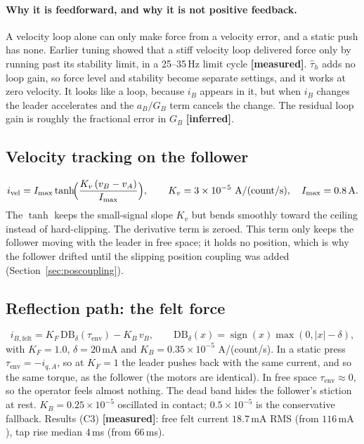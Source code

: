 \documentclass[11pt,a4paper]{article}
\newcommand{\mA}{\,\mathrm{mA}}
\newcommand{\A}{\,\mathrm{A}}
\newcommand{\measured}{\textcolor{teal!70!black}{\textbf{[measured]}}}
\newcommand{\inferred}{\textcolor{orange!80!black}{\textbf{[inferred]}}}
\begin{document}
\paragraph{Why it is feedforward, and why it is not positive feedback.}
A velocity loop alone can only make force from a velocity error, and a
static push has none. Earlier tuning showed that a stiff velocity loop
delivered force only by running past its stability limit, in a
25--35\,Hz limit cycle \measured. $\hat\tau_h$ adds no loop gain, so force
level and stability become separate settings, and it works at zero
velocity. It looks like a loop, because $i_B$ appears in it, but when
$i_B$ changes the leader accelerates and the $a_B/G_B$ term cancels the
change. The residual loop gain is roughly the fractional error in $G_B$
\inferred.

\subsection{Velocity tracking on the follower}

\[
  i_{\mathrm{vel}} = I_{\max}\tanh\!\Bigl(\frac{K_v\,(v_B - v_A)}{I_{\max}}\Bigr),
  \qquad K_v = 3\times10^{-5}\ \mathrm{A/(count/s)},\quad I_{\max}=0.8\A .
\]
The $\tanh$ keeps the small-signal slope $K_v$ but bends smoothly toward
the ceiling instead of hard-clipping. The derivative term is zeroed.
This term only keeps the follower moving with the leader in free space;
it holds no position, which is why the follower drifted until the slipping
position coupling was added (Section~\ref{sec:poscoupling}).

\subsection{Reflection path: the felt force}

\begin{equation}
  i_{B,\mathrm{felt}} = K_F\,\mathrm{DB}_\delta(\tau_{\mathrm{env}}) - K_B\,v_B,
  \qquad \mathrm{DB}_\delta(x) = \operatorname{sign}(x)\max(0,|x|-\delta),
\end{equation}
with $K_F = 1.0$, $\delta = 20\mA$ and $K_B = 0.35\times10^{-5}$
A/(count/s). In a static press $\tau_{\mathrm{env}} = -i_{q,A}$, so at
$K_F=1$ the leader pushes back with the same current, and so the same
torque, as the follower (the motors are identical). In free space
$\tau_{\mathrm{env}}\approx 0$, so the operator feels almost nothing. The
dead band hides the follower's stiction at rest. $K_B = 0.25\times10^{-5}$
oscillated in contact; $0.5\times10^{-5}$ is the conservative fallback.
Results (C3) \measured: free felt current $18.7\mA$ RMS (from $116\mA$),
tap rise median 4\,ms (from 66\,ms).
\end{document}
